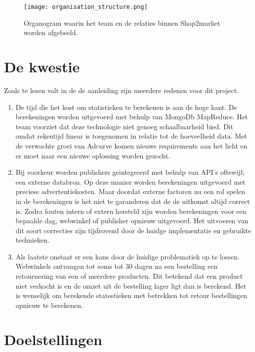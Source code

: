 \begin{figure}[h]
    \texttt{[image: organisation\_structure.png]}
    \caption{Organogram waarin het team en de relaties binnen Shop2market worden afgebeeld.}
    \label{fig:orgchart}
\end{figure}

\pagebreak

\section{De kwestie} %

Zoals te lezen valt in de de aanleiding zijn meerdere redenen voor dit project.

\begin{enumerate}
    \item De tijd die het kost om statistieken te berekenen is aan de hoge kant. De berekeningen worden uitgevoerd met behulp van MongoDb MapReduce. Het team voorziet dat deze technologie niet genoeg schaalbaarheid bied. Dit omdat rekentijd linear is toegenomen in relatie tot de hoeveelheid data. Met de verwachte groei van Adcurve komen nieuwe requirements aan het licht en er moet naar een nieuwe oplossing worden gezocht.
    \item Bij voorkeur worden publishers geintegreerd met behulp van API's oftewijl; een externe databron. Op deze manier worden berekeningen uitgevoerd met preciese advertentiekosten. Maar doordat externe factoren nu een rol spelen in de berekeningen is het niet te garanderen dat de de uitkomst altijd correct is. Zodra fouten intern of extern hersteld zijn worden berekeningen voor een bepaalde dag, webwinkel of publisher opnieuw uitgevoerd. Het uitvoeren van dit soort correcties zijn tijdrovend door de huidge implementatie en gebruikte technieken.
    \item Als laatste onstaat er een kans door de huidige problematiek op te lossen. Webwinkels ontvangen tot soms tot 30 dagen na een bestelling een retournering van een of meerdere producten. Dit betekend dat een product niet verkocht is en de omzet uit de bestelling lager ligt dan is berekend. Het is wenselijk om berekende statestieken met betrekken tot retour bestellingen opnieuw te berekenen.
\end{enumerate}


\section{Doelstellingen} %

